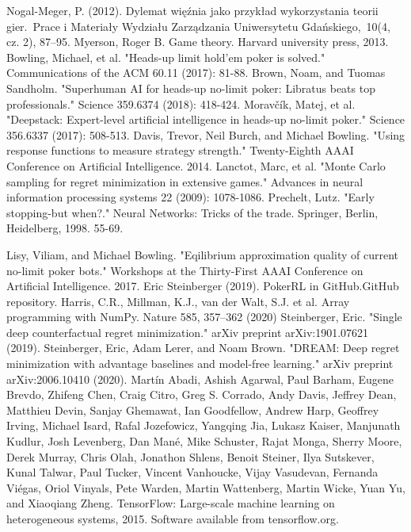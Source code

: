 \documentclass[12pt,oneside,a4paper]{report}
\begin{document}
\begin{thebibliography}{100}
     Nogal-Meger, P. (2012). Dylemat więźnia jako przykład wykorzystania teorii gier. Prace i Materiały Wydziału Zarządzania Uniwersytetu Gdańskiego, 10(4, cz. 2), 87–95.
    Myerson, Roger B. Game theory. Harvard university press, 2013.
    Bowling, Michael, et al. "Heads-up limit hold'em poker is solved." Communications of the ACM 60.11 (2017): 81-88.
    Brown, Noam, and Tuomas Sandholm. "Superhuman AI for heads-up no-limit poker: Libratus beats top professionals." Science 359.6374 (2018): 418-424.
    Moravčík, Matej, et al. "Deepstack: Expert-level artificial intelligence in heads-up no-limit poker." Science 356.6337 (2017): 508-513. 
    Davis, Trevor, Neil Burch, and Michael Bowling. "Using response functions to measure strategy strength." Twenty-Eighth AAAI Conference on Artificial Intelligence. 2014. 
    Lanctot, Marc, et al. "Monte Carlo sampling for regret minimization in extensive games." Advances in neural information processing systems 22 (2009): 1078-1086.
    Prechelt, Lutz. "Early stopping-but when?." Neural Networks: Tricks of the trade. Springer, Berlin, Heidelberg, 1998. 55-69.

    Lisy, Viliam, and Michael Bowling. "Eqilibrium approximation quality of current no-limit poker bots." Workshops at the Thirty-First AAAI Conference on Artificial Intelligence. 2017.
    Eric Steinberger (2019). PokerRL in 
    GitHub.GitHub repository.
    Harris, C.R., Millman, K.J., van der Walt, S.J. et al. Array programming with NumPy. Nature 585, 357–362 (2020)
    Steinberger, Eric. "Single deep counterfactual regret minimization." arXiv preprint arXiv:1901.07621 (2019).
    Steinberger, Eric, Adam Lerer, and Noam Brown. "DREAM: Deep regret minimization with advantage baselines and model-free learning." arXiv preprint arXiv:2006.10410 (2020).
    Martín Abadi, Ashish Agarwal, Paul Barham, Eugene Brevdo,
Zhifeng Chen, Craig Citro, Greg S. Corrado, Andy Davis,
Jeffrey Dean, Matthieu Devin, Sanjay Ghemawat, Ian Goodfellow,
Andrew Harp, Geoffrey Irving, Michael Isard, Rafal Jozefowicz, Yangqing Jia,
Lukasz Kaiser, Manjunath Kudlur, Josh Levenberg, Dan Mané, Mike Schuster,
Rajat Monga, Sherry Moore, Derek Murray, Chris Olah, Jonathon Shlens,
Benoit Steiner, Ilya Sutskever, Kunal Talwar, Paul Tucker,
Vincent Vanhoucke, Vijay Vasudevan, Fernanda Viégas,
Oriol Vinyals, Pete Warden, Martin Wattenberg, Martin Wicke,
Yuan Yu, and Xiaoqiang Zheng.
TensorFlow: Large-scale machine learning on heterogeneous systems,
2015. Software available from tensorflow.org.
\end{thebibliography}
\end{document}
